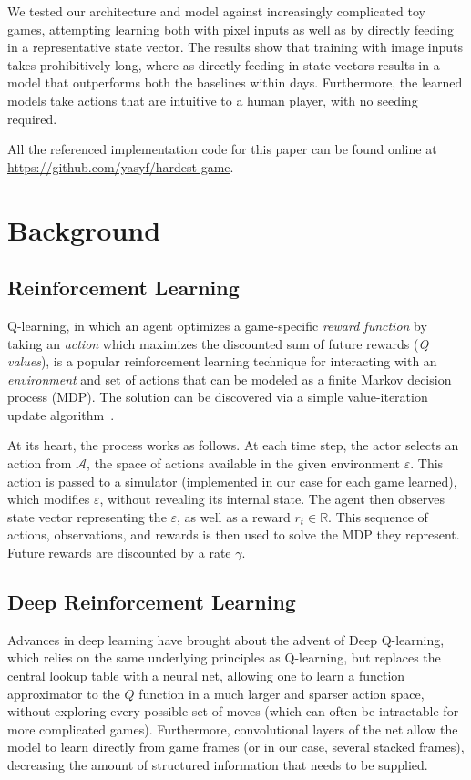 \documentclass[9pt,journal]{IEEEtran}
\begin{document}
We tested our architecture and model against increasingly complicated toy games, attempting learning both with pixel inputs as well as by directly feeding in a representative state vector. The results show that training with image inputs takes prohibitively long, where as directly feeding in state vectors results in a model that outperforms both the baselines within days. Furthermore, the learned models take actions that are intuitive to a human player, with no seeding required.

All the referenced implementation code for this paper can be found online at \url{https://github.com/yasyf/hardest-game}.

\section{Background}

\subsection{Reinforcement Learning}

Q-learning, in which an agent optimizes a game-specific \textit{reward function} by taking an \textit{action} which maximizes the discounted sum of future rewards (\textit{Q values}), is a popular reinforcement learning technique for interacting with an \textit{environment} and set of actions that can be modeled as a finite Markov decision process (MDP). The solution can be discovered via a simple value-iteration update algorithm~\cite{Watkins1992}.

At its heart, the process works as follows. At each time step, the actor selects an action from $\mathcal{A}$, the space of actions available in the given environment $\varepsilon$. This action is passed to a simulator (implemented in our case for each game learned), which modifies $\varepsilon$, without revealing its internal state. The agent then observes state vector representing the $\varepsilon$, as well as a reward $r_t \in \mathbb{R}$. This sequence of actions, observations, and rewards is then used to solve the MDP they represent. Future rewards are discounted by a rate $\gamma$.

\subsection{Deep Reinforcement Learning}

Advances in deep learning have brought about the advent of Deep Q-learning, which relies on the same underlying principles as Q-learning, but replaces the central lookup table with a neural net, allowing one to learn a function approximator to the $Q$ function in a much larger and sparser action space, without exploring every possible set of moves (which can often be intractable for more complicated games). Furthermore, convolutional layers of the net allow the model to learn directly from game frames (or in our case, several stacked frames), decreasing the amount of structured information that needs to be supplied.
\end{document}
